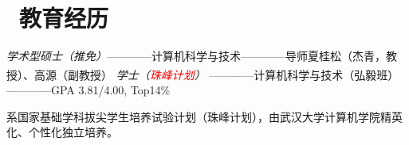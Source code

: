 \documentclass{resume}
\begin{document}


\vspace{-1mm}
\section{\faGraduationCap\ 教育经历}
\textit{学术型硕士（推免）}————计算机科学与技术————导师夏桂松（杰青，教授）、高源（副教授）
\vspace{-2mm}
\textit{学士（\textcolor{red}{珠峰计划}）} ————计算机科学与技术（弘毅班）\textsuperscript{\dag}————GPA 3.81/4.00, Top14\%


{\footnotesize  \dag 系国家基础学科拔尖学生培养试验计划（珠峰计划），由武汉大学计算机学院精英化、个性化独立培养。​}
\end{document}

